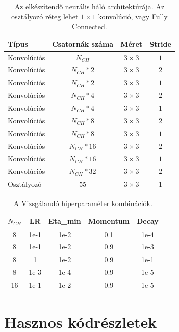 \documentclass[12pt,a4paper,oneside]{report}             %
\begin{document}
\begin{table}[!htb]
	\label{tab:1}
	\centering
	\begin{tabular}{| l | c | c | c |}
		\hline
		\textbf{Típus} & \textbf{Csatornák száma} & \textbf{Méret} & \textbf{Stride} \\ \hline \hline
		Konvolúciós & $N_{CH}$ & $3\times 3$ & $1$ \\ \hline
		Konvolúciós & $N_{CH}*2$ & $3\times 3$ & $2$ \\ \hline
		Konvolúciós & $N_{CH}*2$ & $3\times 3$ & $1$ \\ \hline
		Konvolúciós & $N_{CH}*4$ & $3\times 3$ & $2$ \\ \hline
		Konvolúciós & $N_{CH}*4$ & $3\times 3$ & $1$ \\ \hline
		Konvolúciós & $N_{CH}*8$ & $3\times 3$ & $2$ \\ \hline
		Konvolúciós & $N_{CH}*8$ & $3\times 3$ & $1$ \\ \hline
		Konvolúciós & $N_{CH}*16$ & $3\times 3$ & $2$ \\ \hline
		Konvolúciós & $N_{CH}*16$ & $3\times 3$ & $1$ \\ \hline
		Konvolúciós & $N_{CH}*32$ & $3\times 3$ & $2$ \\ \hline
		Osztályozó & $55$ & $3\times 3$ & $1$ \\ \hline
	\end{tabular}
\caption{Az elkészítendő neurális háló architektúrája. Az osztályozó réteg lehet $1\times 1$ konvolúció, vagy Fully Connected.}
\end{table}

\begin{table}[!htb]
\label{tab:2}
\centering
\begin{tabular}{| c | c | c | c | c |}
	\hline
	$N_{CH}$ & \textbf{LR} & \textbf{Eta\_min} & \textbf{Momentum} & \textbf{Decay} \\ \hline \hline
	8 & 1e-1 & 1e-2 & 0.1 & 1e-4 \\ \hline
	8 & 1e-1 & 1e-2 & 0.9 & 1e-3  \\ \hline
	8 & 1 & 1e-2 & 0.9 & 1e-1  \\ \hline
	8 & 1e-3 & 1e-4 & 0.9 & 1e-5  \\ \hline
	16 & 1e-1& 1e-2 & 0.9 & 1e-5  \\ \hline
\end{tabular}
\caption{A Vizsgálandó hiperparaméter kombinációk.}
\end{table}

\chapter{Hasznos kódrészletek}
\end{document}
